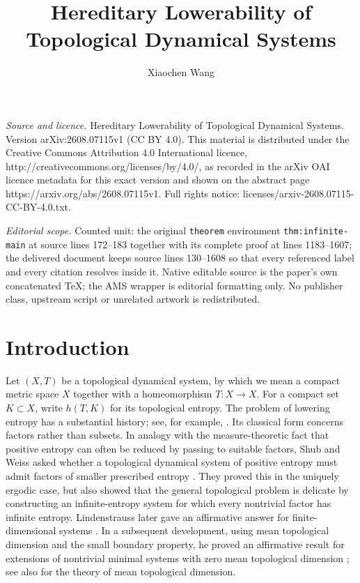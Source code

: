\documentclass[10pt,a4paper]{amsart}
\numberwithin{equation}{section}
\begin{document}
\title[Hereditary Lowerability of Topological Dynamical Systems]{Hereditary Lowerability of Topological Dynamical Systems}
\author{Xiaochen Wang}
\date{}
\maketitle
\noindent\emph{Source and licence.} Hereditary Lowerability of Topological Dynamical Systems. Version arXiv:2608.07115v1 (CC BY 4.0). This material is distributed under the Creative Commons Attribution 4.0 International licence, http://creativecommons.org/licenses/by/4.0/, as recorded in the arXiv OAI licence metadata for this exact version and shown on the abstract page https://arxiv.org/abs/2608.07115v1. Full rights notice: licenses/arxiv-2608.07115-CC-BY-4.0.txt.\par\smallskip
\noindent\textit{Editorial scope.} Counted unit: the original \texttt{theorem} environment \texttt{thm:infinite-main} at source lines 172--183 together with its complete proof at lines 1183--1607; the delivered document keeps source lines 130--1608 so that every referenced label and every citation resolves inside it. Native editable source is the paper's own concatenated TeX; the AMS wrapper is editorial formatting only. No publisher class, upstream script or unrelated artwork is redistributed.
	\section{Introduction}
	\label{sec:introduction}
	
	Let $(X,T)$ be a topological dynamical system, by which we mean a compact
	metric space $X$ together with a homeomorphism $T\colon X\to X$. For a compact
	set $K\subset X$, write $h(T,K)$ for its topological entropy. The problem of
	lowering entropy has a substantial history; see, for example,
	\cite{ShubWeiss1991,Lindenstrauss1995}. 
	Its classical form concerns factors rather than subsets. 
	In analogy with the measure-theoretic fact that positive entropy can often be reduced by passing to suitable factors, Shub and Weiss asked whether a topological dynamical system of positive entropy must admit factors of smaller prescribed entropy \cite{ShubWeiss1991}. 
	They proved this in the uniquely ergodic case, but also showed that the general topological problem is delicate by constructing an infinite-entropy system for which every nontrivial factor has infinite entropy. Lindenstrauss later gave an affirmative answer for finite-dimensional systems \cite{Lindenstrauss1995}. 
	In a subsequent development, using mean topological dimension and the small boundary property, he proved an affirmative result for extensions of nontrivial minimal systems with zero mean topological dimension \cite{Lindenstrauss1999}; see also \cite{LindenstraussWeiss2000} for the theory of mean topological dimension.
	
\end{document}
